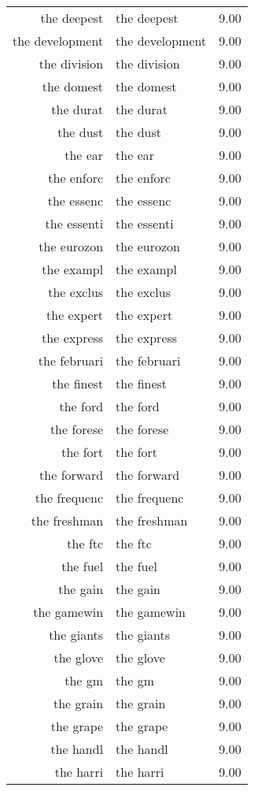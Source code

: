 \begin{table}[ht]
\begin{tabular}{rlr}
  the deepest & the deepest & 9.00 \\ 
  the development & the development & 9.00 \\ 
  the division & the division & 9.00 \\ 
  the domest & the domest & 9.00 \\ 
  the durat & the durat & 9.00 \\ 
  the dust & the dust & 9.00 \\ 
  the ear & the ear & 9.00 \\ 
  the enforc & the enforc & 9.00 \\ 
  the essenc & the essenc & 9.00 \\ 
  the essenti & the essenti & 9.00 \\ 
  the eurozon & the eurozon & 9.00 \\ 
  the exampl & the exampl & 9.00 \\ 
  the exclus & the exclus & 9.00 \\ 
  the expert & the expert & 9.00 \\ 
  the express & the express & 9.00 \\ 
  the februari & the februari & 9.00 \\ 
  the finest & the finest & 9.00 \\ 
  the ford & the ford & 9.00 \\ 
  the forese & the forese & 9.00 \\ 
  the fort & the fort & 9.00 \\ 
  the forward & the forward & 9.00 \\ 
  the frequenc & the frequenc & 9.00 \\ 
  the freshman & the freshman & 9.00 \\ 
  the ftc & the ftc & 9.00 \\ 
  the fuel & the fuel & 9.00 \\ 
  the gain & the gain & 9.00 \\ 
  the gamewin & the gamewin & 9.00 \\ 
  the giants & the giants & 9.00 \\ 
  the glove & the glove & 9.00 \\ 
  the gm & the gm & 9.00 \\ 
  the grain & the grain & 9.00 \\ 
  the grape & the grape & 9.00 \\ 
  the handl & the handl & 9.00 \\ 
  the harri & the harri & 9.00 \\ 

\end{tabular}
\end{table}
